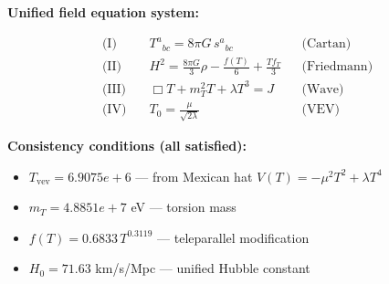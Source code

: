 
\textbf{Unified field equation system:}

\begin{align}
  \text{(I)} \quad & T^a{}_{bc} = 8\pi G \, s^a{}_{bc} && \text{(Cartan)} \\
  \text{(II)} \quad & H^2 = \frac{8\pi G}{3}\rho - \frac{f(T)}{6} + \frac{Tf_T}{3} && \text{(Friedmann)} \\
  \text{(III)} \quad & \Box T + m_T^2 T + \lambda T^3 = J && \text{(Wave)} \\
  \text{(IV)} \quad & T_0 = \frac{\mu}{\sqrt{2\lambda}} && \text{(VEV)}
\end{align}

\textbf{Consistency conditions (all satisfied):}
\begin{itemize}
  \item $T_{\text{vev}} = 6.9075e+6$ — from Mexican hat $V(T) = -\mu^2 T^2 + \lambda T^4$
  \item $m_T = 4.8851e+7$ eV — torsion mass
  \item $f(T) = 0.6833 \, T^{0.3119}$ — teleparallel modification
  \item $H_0 = 71.63$ km/s/Mpc — unified Hubble constant
\end{itemize}